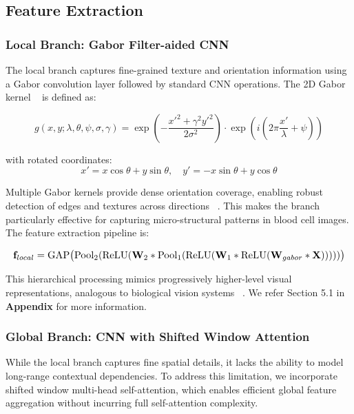 \documentclass[preprint,12pt]{elsarticle}
\begin{document}
\subsection{Feature Extraction}

\subsubsection{Local Branch: Gabor Filter-aided CNN}

The local branch captures fine-grained texture and orientation information using a Gabor convolution layer followed by standard CNN operations. The 2D Gabor kernel ~\cite{b1} is defined as:

\begin{equation*}
g(x, y; \lambda, \theta, \psi, \sigma, \gamma)
=
\exp\left(-\frac{x'^2 + \gamma^2 y'^2}{2\sigma^2}\right)
\cdot
\exp\left(i\left(2\pi \frac{x'}{\lambda} + \psi\right)\right)
\end{equation*}

with rotated coordinates:
\begin{equation*}
x' = x\cos\theta + y\sin\theta,\quad
y' = -x\sin\theta + y\cos\theta
\end{equation*}

Multiple Gabor kernels provide dense orientation coverage, enabling robust detection of edges and textures across directions ~\cite{b2}. This makes the branch particularly effective for capturing micro-structural patterns in blood cell images. The feature extraction pipeline is:

\begin{equation*}
\resizebox{\columnwidth}{!}{$
\mathbf{f}_{local}
=
\mathrm{GAP}\big(
\mathrm{Pool}_2(
\mathrm{ReLU}(
\mathbf{W}_2 *
\mathrm{Pool}_1(
\mathrm{ReLU}(
\mathbf{W}_1 *
\mathrm{ReLU}(
\mathbf{W}_{gabor} * \mathbf{X}
)
)
)
)
)
\big)
$}
\end{equation*}

This hierarchical processing mimics progressively higher-level visual representations, analogous to biological vision systems ~\cite{b3}.
We refer Section 5.1 in \textbf{Appendix} for more information.

\subsubsection{Global Branch: CNN with Shifted Window Attention}

While the local branch captures fine spatial details, it lacks the ability to model long-range contextual dependencies. To address this limitation, we incorporate shifted window multi-head self-attention, which enables efficient global feature aggregation without incurring full self-attention complexity.
\end{document}
